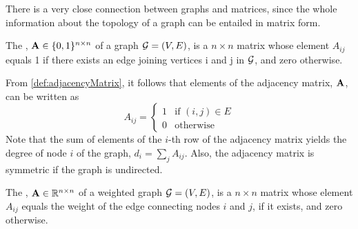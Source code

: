 There is a very close connection between graphs and matrices, since the whole information about the topology of a graph can be entailed in matrix form.
\begin{definition}
	\label{def:adjacencyMatrix}
	The , $\mathbf A \in \{0,1\}^{n \times n}$ of a graph $\mathcal G = (V,E)$, is a $n\times n$ matrix whose element $A_{ij}$ equals 1 if there exists an edge joining vertices i and j in $\mathcal G$, and zero otherwise.
\end{definition}
From \cref{def:adjacencyMatrix}, it follows that elements of the adjacency matrix, $\mathbf A$, can be written as
\begin{equation}
	A_{ij} =
	\begin{cases}
		1 & \text{if } (i,j) \in E\\
		0 & \text{otherwise}
	\end{cases}
\end{equation}
Note that the sum of elements of the $i$-th row of the adjacency matrix yields the degree of node $i$ of the graph, $d_{i} = \sum_{j} A_{ij}$. Also, the adjacency matrix is symmetric if the graph is undirected.
\begin{definition}
	\label{def:weightedAdjacencyMatrix}
	The , $\mathbf A \in \mathbb{R}^{n \times n}$ of a weighted graph $\mathcal G = (V,E)$, is a $n\times n$ matrix whose element $A_{ij}$ equals the weight of the edge connecting nodes $i$ and $j$, if it exists, and zero otherwise. 
\end{definition}

